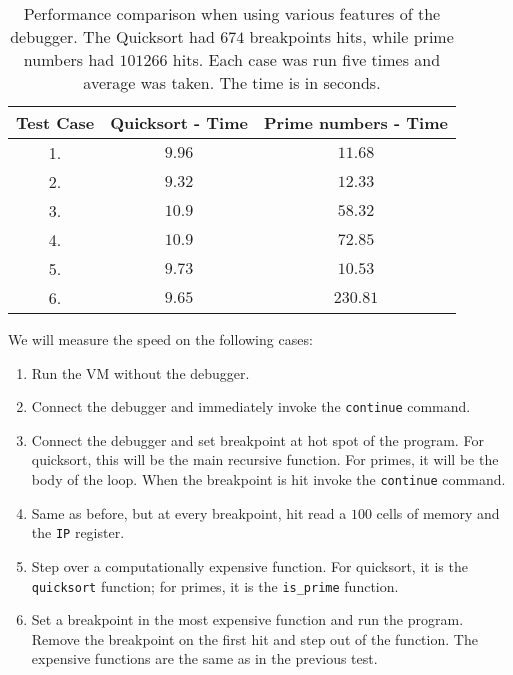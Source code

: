 \begin{table}[]
\centering
\begin{tabular}{||c c c||}
\hline
Test Case & Quicksort - Time & Prime numbers - Time \\
\hline\hline
1. & $9.96$            & $11.68$  \\
2. & $9.32$            & $12.33$  \\
3. & $10.9$            & $58.32$  \\
4. & $10.9$            & $72.85$  \\
5. & $9.73$            & $10.53$  \\
6. & $9.65$            & $230.81$ \\
\hline
\end{tabular}
\caption{Performance comparison when using various features of the debugger.
The Quicksort had $674$ breakpoints hits, while prime numbers had $101266$ hits.
    Each case was run five times and average was taken. The time is in seconds.}
\label{table:benchmark}
\end{table}


We will measure the speed on the following cases:
\begin{enumerate}
    \item Run the VM without the debugger.
    \item Connect the debugger and immediately invoke the \texttt{continue} command.
    \item Connect the debugger and set breakpoint at hot spot of the program.
        For quicksort, this will be the main recursive function. For primes,
        it will be the body of the loop. When the breakpoint is hit invoke
        the \texttt{continue} command.
    \item Same as before, but at every breakpoint, hit read a $100$ cells of
        memory and the \texttt{IP} register.
    \item  Step over a computationally expensive function. For quicksort, it is
        the \texttt{quicksort} function; for primes, it is the \verb|is_prime|
        function.
    \item Set a breakpoint in the most expensive function and run the program.
        Remove the breakpoint on the first hit and step out of the function.
        The expensive functions are the same as in the previous test.
\end{enumerate}


